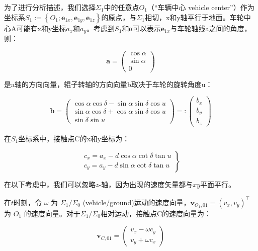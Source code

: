 为了进行分析描述，我们选择$\Sigma_{1}$中的任意点$O_{1}$（“车辆中心 vehicle center”）作为坐标系$S_{1}:=\left\{O_{1} ; \mathbf{e}_{1 x}, \mathbf{e}_{1 y}, \mathbf{e}_{1 z}\right\}$的原点，与$\Sigma_{1}$相切，x和y轴平行于地面。车轮中心A可能有x和y坐标$a_x$和$a_y$。考虑到$S_1$和α可以表示$\mathbf{e}_{1 x}$与车轮轴线a之间的角度，则：

\begin{equation}
    \mathbf{a}=\left(\begin{array}{c}
    {\cos \alpha} \\
    {\sin \alpha} \\
    {0}
    \end{array}\right)
\end{equation}

是a轴的方向向量，辊子转轴的方向向量b取决于车轮的旋转角度u：

\begin{equation}
    \mathbf{b}=\left(\begin{array}{c}
    {\cos \alpha \cos \delta-\sin \alpha \sin \delta \cos u} \\
    {\sin \alpha \cos \delta+\cos \alpha \sin \delta \cos u} \\
    {\sin \delta \sin u}
    \end{array}\right)=:\left(\begin{array}{l}
    {b_{x}} \\
    {b_{y}} \\
    {b_{z}}
    \end{array}\right)
\end{equation}

在$S_1$坐标系中，接触点C的x和y坐标为：

\begin{equation}
    \left.\begin{array}{l}
    {c_{x}=a_{x}-d \cos \alpha \cot \delta \tan u} \\
    {c_{y}=a_{y}-d \sin \alpha \cot \delta \tan u}
    \end{array}\right\}
\end{equation}


在以下考虑中，我们可以忽略$z$-轴，因为出现的速度矢量都与$x y$平面平行。

在$t$时刻，令 $\omega$ 为 $\Sigma_{1} / \Sigma_{0}$ (vehicle/ground)运动的速度向量，$\mathbf{v}_{O_{1}, 01}=\left(v_{x}, v_{y}\right)^{\top}$ 为 $O_{1}$ 的速度向量。对于$\Sigma_{1} / \Sigma_{0}$相对运动，接触点C的速度向量为：

\begin{equation}
\mathbf{v}_{C, 01}=\left(\begin{array}{c}
{v_{x}-\omega c_{y}} \\
{v_{y}+\omega c_{x}}
\end{array}\right)
\end{equation}

